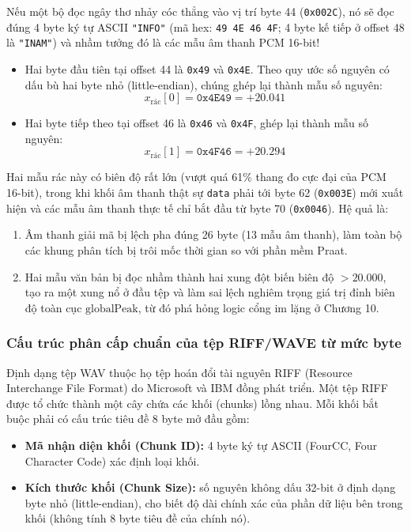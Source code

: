 Nếu một bộ đọc ngây thơ nhảy cóc thẳng vào vị trí byte 44 (\texttt{0x002C}), nó sẽ đọc đúng 4 byte ký tự ASCII \texttt{"INFO"} (mã hex: \texttt{49 4E 46 4F}; 4 byte kế tiếp ở offset 48 là \texttt{"INAM"}) và nhầm tưởng đó là các mẫu âm thanh PCM 16-bit!
\begin{itemize}[leftmargin=1.5em, itemsep=2pt]
    \item Hai byte đầu tiên tại offset 44 là \texttt{0x49} và \texttt{0x4E}. Theo quy ước số nguyên có dấu bù hai byte nhỏ (little-endian), chúng ghép lại thành mẫu số nguyên:
    \begin{equation}
    x_{\text{rác}}[0] = \texttt{0x4E49} = +20.041
    \end{equation}
    \item Hai byte tiếp theo tại offset 46 là \texttt{0x46} và \texttt{0x4F}, ghép lại thành mẫu số nguyên:
    \begin{equation}
    x_{\text{rác}}[1] = \texttt{0x4F46} = +20.294
    \end{equation}
\end{itemize}
Hai mẫu rác này có biên độ rất lớn (vượt quá 61\% thang đo cực đại của PCM 16-bit), trong khi khối âm thanh thật sự \texttt{data} phải tới byte 62 (\texttt{0x003E}) mới xuất hiện và các mẫu âm thanh thực tế chỉ bắt đầu từ byte 70 (\texttt{0x0046}). Hệ quả là:
\begin{enumerate}[leftmargin=1.5em, itemsep=2pt]
    \item Âm thanh giải mã bị lệch pha đúng 26 byte (13 mẫu âm thanh), làm toàn bộ các khung phân tích bị trôi mốc thời gian so với phần mềm Praat.
    \item Hai mẫu văn bản bị đọc nhầm thành hai xung đột biến biên độ $> 20.000$, tạo ra một xung nổ ở đầu tệp và làm sai lệch nghiêm trọng giá trị đỉnh biên độ toàn cục $\text{globalPeak}$, từ đó phá hỏng logic cổng im lặng ở Chương 10.
\end{enumerate}

\subsubsection*{Cấu trúc phân cấp chuẩn của tệp RIFF/WAVE từ mức byte}
Định dạng tệp WAV thuộc họ tệp hoán đổi tài nguyên RIFF (Resource Interchange File Format) do Microsoft và IBM đồng phát triển. Một tệp RIFF được tổ chức thành một cây chứa các khối (chunks) lồng nhau. Mỗi khối bắt buộc phải có cấu trúc tiêu đề 8 byte mở đầu gồm:
\begin{itemize}[leftmargin=1.5em, itemsep=2pt]
    \item \textbf{Mã nhận diện khối (Chunk ID):} 4 byte ký tự ASCII (FourCC, Four Character Code) xác định loại khối.
    \item \textbf{Kích thước khối (Chunk Size):} số nguyên không dấu 32-bit ở định dạng byte nhỏ (little-endian), cho biết độ dài chính xác của phần dữ liệu bên trong khối (không tính 8 byte tiêu đề của chính nó).
\end{itemize}

